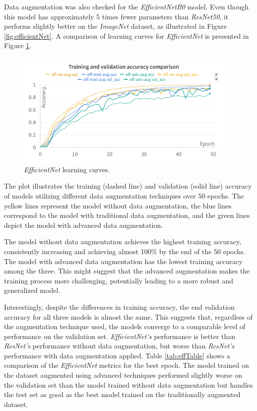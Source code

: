 \newpage
Data augmentation was also checked for the \textit{EfficientNetB0} model. Even though this model has approximately 5 times fewer parameters than \textit{ResNet50}, it performs slightly better on the \textit{ImageNet} dataset, as illustrated in Figure \ref{fig:efficientNet}. A comparison of learning curves for \textit{EfficientNet} is presented in Figure \ref{fig:efficientLC}.

\begin{figure}[!htb]
    \centering
    \includegraphics[width=0.95\textwidth]{Images/flowers-results/efficientNetLC.png}
    \caption{\textit{EfficientNet} learning curves.}
    \label{fig:efficientLC}
\end{figure}


The plot illustrates the training (dashed line) and validation (solid line) accuracy of models utilizing different data augmentation techniques over $50$ epochs. The yellow lines represent the model without data augmentation, the blue lines correspond to the model with traditional data augmentation, and the green lines depict the model with advanced data augmentation.

The model without data augmentation achieves the highest training accuracy, consistently increasing and achieving almost 100\% by the end of the $50$ epochs. The model with advanced data augmentation has the lowest training accuracy among the three. This might suggest that the advanced augmentation makes the training process more challenging, potentially leading to a more robust and generalized model.

Interestingly, despite the differences in training accuracy, the end validation accuracy for all three models is almost the same. This suggests that, regardless of the augmentation technique used, the models converge to a comparable level of performance on the validation set. \textit{EfficientNet's} performance is better than \textit{ResNet's} performance without data augmentation, but worse than \textit{ResNet's} performance with data augmentation applied. Table \ref{tab:effTable} shows a comparison of the \textit{EfficientNet} metrics for the best epoch. The model trained on the dataset augmented using advanced techniques performed slightly worse on the validation set than the model trained without data augmentation but handles the test set as good as the best model trained on the traditionally augmented dataset. 

